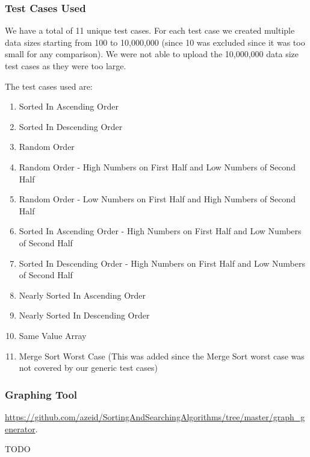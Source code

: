 \subsubsection{Test Cases Used}
We have a total of 11 unique test cases. For each test case we created multiple data sizes starting from 100 to 10,000,000 (since 10 was excluded since it was too small for any comparison). We were not able to upload the 10,000,000 data size test cases as they were too large.

The test cases used are:
\begin{enumerate}
    \item Sorted In Ascending Order
    \item Sorted In Descending Order  
    \item Random Order  
    \item Random Order - High Numbers on First Half and Low Numbers of Second Half  
    \item Random Order - Low Numbers on First Half and High Numbers of Second Half  
    \item Sorted In Ascending Order - High Numbers on First Half and Low Numbers of Second Half 
    \item Sorted In Descending Order - High Numbers on First Half and Low Numbers of Second Half 
    \item Nearly Sorted In Ascending Order
    \item Nearly Sorted In Descending Order
    \item Same Value Array
    \item Merge Sort Worst Case (This was added since the Merge Sort worst case was not covered by our generic test cases)
    
\end{enumerate}

\subsubsection{Graphing Tool}
\url{https://github.com/azeid/SortingAndSearchingAlgorithms/tree/master/graph_generator}.

TODO
